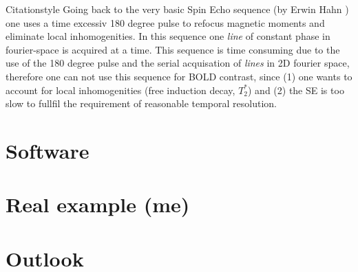 \documentclass[a4paper]{scrartcl}
\begin{document}
Citationstyle
Going back to the very basic Spin Echo sequence (by Erwin Hahn \cite{hahn}) one uses a time excessiv 180 degree pulse to refocus magnetic moments and eliminate local inhomogenities.
In this sequence one \textit{line} of constant phase in fourier-space is acquired at a time.
This sequence is time consuming due to the use of the 180 degree pulse and the serial acquisation of \textit{lines} in 2D fourier space, therefore one can not use this sequence for BOLD contrast, since (1) one wants to account for local inhomogenities (free induction decay, $T_2^*$) and (2) the SE is too slow to fullfil the requirement of reasonable temporal resolution.


\section{Software}
\label{sec:software}


\section{Real example (me)}
\label{sec:example}

\section{Outlook}
\label{sec:outlook}

\newpage
\printbibliography
\end{document}
